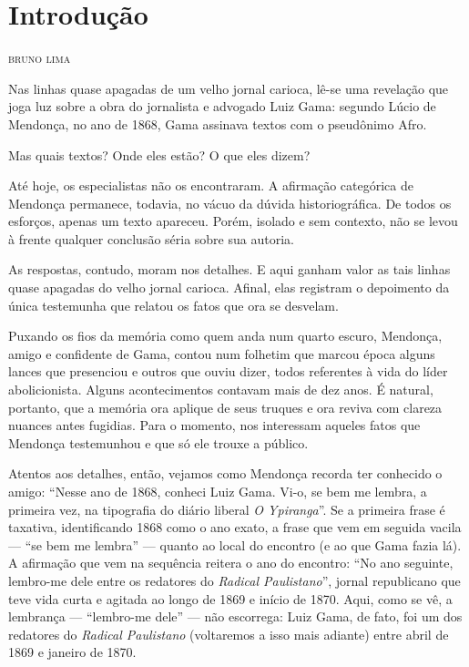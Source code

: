 \chapter*{Introdução}

\begin{flushright}
\textsc{bruno lima}
\end{flushright}

Nas linhas quase apagadas de um velho jornal carioca, lê-se uma
revelação que joga luz sobre a obra do jornalista e advogado Luiz Gama:
segundo Lúcio de Mendonça, no ano de 1868, Gama assinava textos com o
pseudônimo Afro.

Mas quais textos? Onde eles estão? O que eles dizem?

Até hoje, os especialistas não os encontraram. A afirmação categórica de
Mendonça permanece, todavia, no vácuo da dúvida historiográfica. De
todos os esforços, apenas um texto apareceu. Porém, isolado e sem
contexto, não se levou à frente qualquer conclusão séria sobre sua
autoria.

As respostas, contudo, moram nos detalhes. E aqui ganham valor as tais
linhas quase apagadas do velho jornal carioca. Afinal, elas registram o
depoimento da única testemunha que relatou os fatos que ora se desvelam.

Puxando os fios da memória como quem anda num quarto escuro, Mendonça,
amigo e confidente de Gama, contou num folhetim que marcou época alguns
lances que presenciou e outros que ouviu dizer, todos referentes à vida
do líder abolicionista. Alguns acontecimentos contavam mais de dez anos.
É natural, portanto, que a memória ora aplique de seus truques e ora
reviva com clareza nuances antes fugidias. Para o momento, nos
interessam aqueles fatos que Mendonça testemunhou e que só ele trouxe a
público.

Atentos aos detalhes, então, vejamos como Mendonça recorda ter conhecido
o amigo: ``Nesse ano de 1868, conheci Luiz Gama. Vi-o, se bem me lembra,
a primeira vez, na tipografia do diário liberal \emph{O Ypiranga}''. Se a
primeira frase é taxativa, identificando 1868 como o ano exato, a frase
que vem em seguida vacila --- ``se bem me lembra'' --- quanto ao local do
encontro (e ao que Gama fazia lá). A afirmação que vem na sequência
reitera o ano do encontro: ``No ano seguinte, lembro-me dele entre os
redatores do \emph{Radical Paulistano}'', jornal republicano que teve
vida curta e agitada ao longo de 1869 e início de 1870. Aqui, como se
vê, a lembrança --- ``lembro-me dele'' --- não escorrega: Luiz Gama, de
fato, foi um dos redatores do \emph{Radical Paulistano}
(voltaremos a isso mais adiante) entre abril de 1869 e janeiro de 1870.

